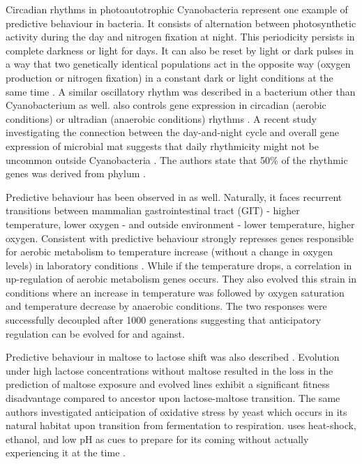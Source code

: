 Circadian rhythms in photoautotrophic Cyanobacteria represent one example of predictive behaviour in bacteria.
It consists of alternation between photosynthetic activity during the day and nitrogen fixation at night.
This periodicity persists in complete darkness or light for days.
It can also be reset by light or dark pulses in a way that two genetically identical populations act in the opposite way (oxygen production or nitrogen fixation) in a constant dark or light conditions at the same time \cite{kondo1993circadian}.
A similar oscillatory rhythm was described in a bacterium other than Cyanobacterium as well.
 also controls gene expression in circadian (aerobic conditions) or ultradian (anaerobic conditions) rhythms \cite{min2005rhythmic}.
A recent study investigating the connection between the day-and-night cycle and overall gene expression of microbial mat suggests that daily rhythmicity might not be uncommon outside Cyanobacteria \cite{hornlein2018daily}.
The authors state that 50\% of the rhythmic genes was derived from phylum .

Predictive behaviour has been observed in  as well.
Naturally, it faces recurrent transitions between mammalian gastrointestinal tract (GIT) - higher temperature, lower oxygen - and outside environment - lower temperature, higher oxygen.
Consistent with predictive behaviour  strongly represses genes responsible for aerobic metabolism to temperature increase (without a change in oxygen levels) in laboratory conditions \cite{tagkopoulos2008predictive}.
While if the temperature drops, a correlation in up-regulation of aerobic metabolism genes occurs.
They also evolved this strain in conditions where an increase in temperature was followed by oxygen saturation and temperature decrease by anaerobic conditions.
The two responses were successfully decoupled after 1000 generations suggesting that anticipatory regulation can be evolved for and against.

Predictive behaviour in maltose to lactose shift was also described \cite{mitchell2009adaptive}.
Evolution under high lactose concentrations without maltose resulted in the loss in the prediction of maltose exposure and evolved lines exhibit a significant fitness disadvantage compared to ancestor upon lactose-maltose transition.
The same authors investigated anticipation of oxidative stress by yeast which occurs in its natural habitat upon transition from fermentation to respiration.
 uses heat-shock, ethanol, and low pH as cues to prepare for its coming without actually experiencing it at the time \cite{mitchell2009adaptive}.


